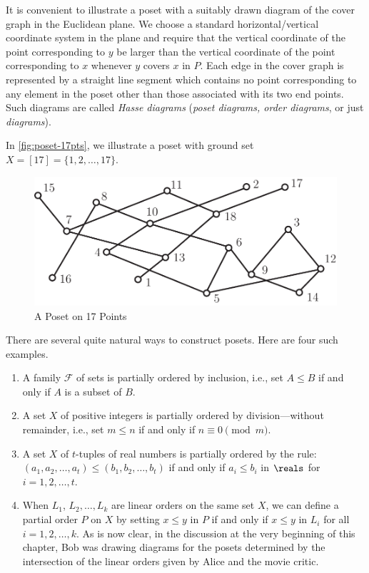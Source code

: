 It is convenient to illustrate a
poset with a suitably drawn diagram of the cover
graph in the Euclidean plane.  We choose a standard
horizontal/vertical coordinate system in the plane and require that
the vertical coordinate of the point corresponding to $y$ be larger
than the vertical coordinate of the point corresponding to $x$
whenever $y$ covers $x$ in $P$. Each edge in the cover graph is represented
by a straight line segment which contains no point corresponding to any
element in the poset other than those associated with its two end points.
Such diagrams are called \textit{Hasse diagrams}
(\textit{poset diagrams, order diagrams}, or just \textit{diagrams}).

In \autoref{fig:poset-17pts},
we illustrate a poset with ground set $X=[17]=\{1,2,\dots,17\}$. 

\begin{figure}
\begin{center}
\includegraphics*[scale=.4]{posets-figs/wttfig-1}
\caption{A Poset on 17 Points}
\label{fig:poset-17pts}
\end{center}
\end{figure}

There are several quite natural ways to construct posets.  Here
are four such examples.
\begin{enumerate}
\item A family $\mathcal{F}$ of sets is partially ordered by
inclusion, i.e., set $A\le B$ if and only if $A$ is a subset of
$B$.
\item A set $X$ of positive integers is partially ordered by
division---without remainder, i.e., set $m\le n$ if and only if
$n\equiv 0\pmod{m}$.  
\item A set $X$ of $t$-tuples of real numbers is
partially ordered by the rule: \\
$(a_1,a_2,\dots,a_t)\le (b_1,b_2,\dots,b_t)$ if
and only if $a_i\le b_i$ in $\reals$ for $i=1,2,\dots,t$.  
\item When $L_1$, $L_2,\dots,L_k$ are linear orders on the same set
$X$, we can define a partial order $P$ on  $X$ by setting
$x\le y$ in $P$ if and only if $x\le y$ in $L_i$ for all $i=1,2,\dots,k$.
As is now clear, in the discussion at the very beginning of 
this chapter, Bob was drawing diagrams for the posets determined by 
the intersection of the linear orders given by Alice and the movie critic.
\end{enumerate}

